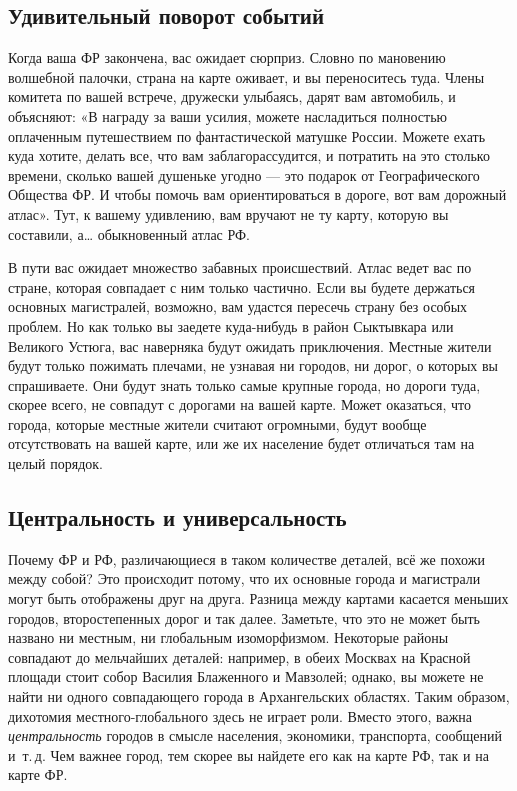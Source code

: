 \documentclass[../main.tex]{subfiles}
\begin{document}
\subsection{Удивительный поворот событий}

Когда ваша ФР закончена, вас ожидает сюрприз. Словно по мановению волшебной палочки, страна на карте оживает, и вы переноситесь туда. Члены комитета по вашей встрече, дружески улыбаясь, дарят вам автомобиль, и объясняют: «В награду за ваши усилия, можете насладиться полностью оплаченным путешествием по фантастической матушке России. Можете ехать куда хотите, делать все, что вам заблагорассудится, и потратить на это столько времени, сколько вашей душеньке угодно --- это подарок от Географического Общества ФР\@. И чтобы помочь вам ориентироваться в дороге, вот вам дорожный атлас». Тут, к вашему удивлению, вам вручают не ту карту, которую вы составили, а\ldots{} обыкновенный атлас РФ.

В пути вас ожидает множество забавных происшествий. Атлас ведет вас по стране, которая совпадает с ним только частично. Если вы будете держаться основных магистралей, возможно, вам удастся пересечь страну без особых проблем. Но как только вы заедете куда-нибудь в район Сыктывкара или Великого Устюга, вас наверняка будут ожидать приключения. Местные жители будут только пожимать плечами, не узнавая ни городов, ни дорог, о которых вы спрашиваете. Они будут знать только самые крупные города, но дороги туда, скорее всего, не совпадут с дорогами на вашей карте. Может оказаться, что города, которые местные жители считают огромными, будут вообще отсутствовать на вашей карте, или же их население будет отличаться там на целый порядок.


\subsection{Центральность и универсальность}

Почему ФР и РФ, различающиеся в таком количестве деталей, всё же похожи между собой? Это происходит потому, что их основные города и магистрали могут быть отображены друг на друга. Разница между картами касается меньших городов, второстепенных дорог и так далее. Заметьте, что это не может быть названо ни местным, ни глобальным изоморфизмом. Некоторые районы совпадают до мельчайших деталей: например, в обеих Москвах на Красной площади стоит собор Василия Блаженного и Мавзолей; однако, вы можете не найти ни одного совпадающего города в Архангельских областях. Таким образом, дихотомия местного-глобального здесь не играет роли. Вместо этого, важна \emph{центральность} городов в смысле населения, экономики, транспорта, сообщений и~т.\,д. Чем важнее город, тем скорее вы найдете его как на карте РФ, так и на карте ФР.
\end{document}
